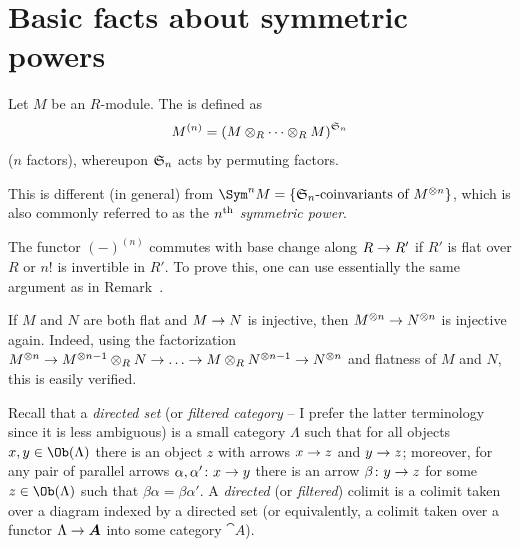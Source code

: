\documentclass[a4paper,parskip=half,numbers=enddot, DIV=12]{scrreprt}
\begin{document}
\section{Basic facts about symmetric powers}
\begin{defi}
	Let $M$ be an $R$-module. The  is defined as
	\begin{align*}
		M^{(n)}=\left(M\otimes_R\cdots\otimes_RM\right)^{\mathfrak{S}_n}
	\end{align*}
	($n$ factors), whereupon $\mathfrak{S}_n$ acts by permuting factors.
\end{defi}
\begin{rem}
	\begin{alphanumerate}
		\item This is different (in general) from $\Sym^nM=\left\{\SS_n\text{-coinvariants of }M^{\otimes n}\right\}$, which is also commonly referred to as the \emph{$n^{\text{th}}$ symmetric power}.
		\item The functor $(-)^{(n)}$ commutes with base change along $R\morphism R'$ if $R'$ is flat over $R$ or $n!$ is invertible in $R'$. To prove this, one can use essentially the same argument as in Remark~.
		\item If $M$ and $N$ are both flat and $M\morphism N$ is injective, then $M^{\otimes n}\morphism N^{\otimes n}$ is injective again. Indeed, using the factorization $M^{\otimes n}\morphism M^{\otimes n-1}\otimes_RN\morphism\ldots\morphism M\otimes_RN^{\otimes n-1}\morphism N^{\otimes n}$ and flatness of $M$ and $N$, this is easily verified. 
	\end{alphanumerate}
\end{rem}
Recall that a \emph{directed set} (or \emph{filtered category} -- I prefer the latter terminology since it is less ambiguous) is a small category $\Lambda$ such that for all objects $x,y\in\Ob(\Lambda)$ there is an object $z$ with arrows $x\morphism z$ and $y\morphism z$; moreover, for any pair of parallel arrows $\alpha,\alpha'\colon x\morphism y$ there is an arrow $\beta\colon y\morphism z$ for some $z\in\Ob(\Lambda)$ such that $\beta\alpha=\beta\alpha'$. A \emph{directed} (or \emph{filtered}) colimit is a colimit taken over a diagram indexed by a directed set (or equivalently, a colimit taken over a functor $\Lambda\morphism\cat A$ into some category $\cat A$).
\end{document}
